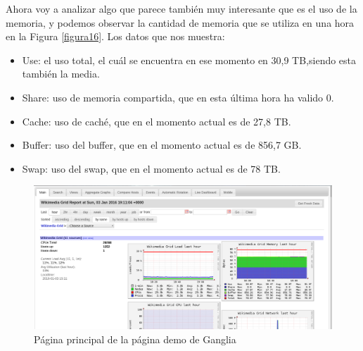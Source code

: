 Ahora voy a analizar algo que parece también muy interesante que es el uso de la memoria, y podemos observar la cantidad de memoria que se utiliza en una hora en la Figura \ref{figura16}. Los datos que nos muestra:
\begin{itemize}
	\item \textcolor{morado}{Use:} el uso total, el cuál se encuentra en ese momento en 30,9 TB,siendo esta también la media.
	\item \textcolor{azuloscuro}{Share:} uso de memoria compartida, que en esta última hora ha valido 0.
	\item \textcolor{dkgreen}{Cache:} uso de caché, que en el momento actual es de 27,8 TB.
	\item \textcolor{verdelima}{Buffer:} uso del buffer, que en el momento actual es de 856,7 GB.
	\item \textcolor{violeta}{Swap:} uso del swap, que en el momento actual es de 78 TB.
\end{itemize}
\begin{figure}[H] %
	\centering
	\includegraphics[scale=0.25]{figuras/figura14.png}  %
	
	
	\caption{Página principal de la página demo de Ganglia \cite{ganglia}}
	\label{figura14}
\end{figure}

